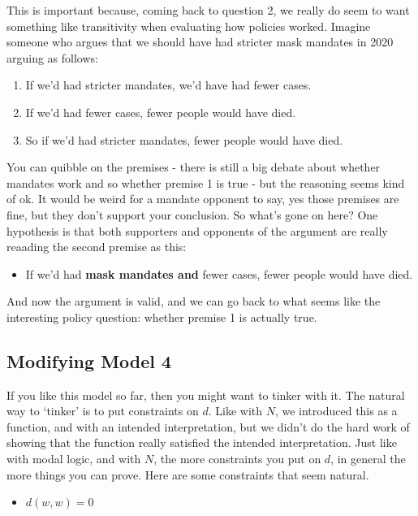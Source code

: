 \documentclass[
]{article}
\providecommand{\tightlist}{%
  \setlength{\itemsep}{0pt}\setlength{\parskip}{0pt}}\usepackage{longtable,booktabs,array}
\begin{document}
This is important because, coming back to question 2, we really do seem
to want something like transitivity when evaluating how policies worked.
Imagine someone who argues that we should have had stricter mask
mandates in 2020 arguing as follows:

\begin{enumerate}
\def\labelenumi{\arabic{enumi}.}
\tightlist
\item
  If we'd had stricter mandates, we'd have had fewer cases.
\item
  If we'd had fewer cases, fewer people would have died.
\item
  So if we'd had stricter mandates, fewer people would have died.
\end{enumerate}

You can quibble on the premises - there is still a big debate about
whether mandates work and so whether premise 1 is true - but the
reasoning seems kind of ok. It would be weird for a mandate opponent to
say, yes those premises are fine, but they don't support your
conclusion. So what's gone on here? One hypothesis is that both
supporters and opponents of the argument are really reaading the second
premise as this:

\begin{itemize}
\tightlist
\item
  If we'd had \textbf{mask mandates and} fewer cases, fewer people would
  have died.
\end{itemize}

And now the argument is valid, and we can go back to what seems like the
interesting policy question: whether premise 1 is actually true.

\hypertarget{modifying-model-4}{%
\subsection{Modifying Model 4}\label{modifying-model-4}}

If you like this model so far, then you might want to tinker with it.
The natural way to `tinker' is to put constraints on \(d\). Like with
\(N\), we introduced this as a function, and with an intended
interpretation, but we didn't do the hard work of showing that the
function really satisfied the intended interpretation. Just like with
modal logic, and with \(N\), the more constraints you put on \(d\), in
general the more things you can prove. Here are some constraints that
seem natural.

\begin{itemize}
\tightlist
\item
  \(d(w, w) = 0\)
\end{itemize}
\end{document}
